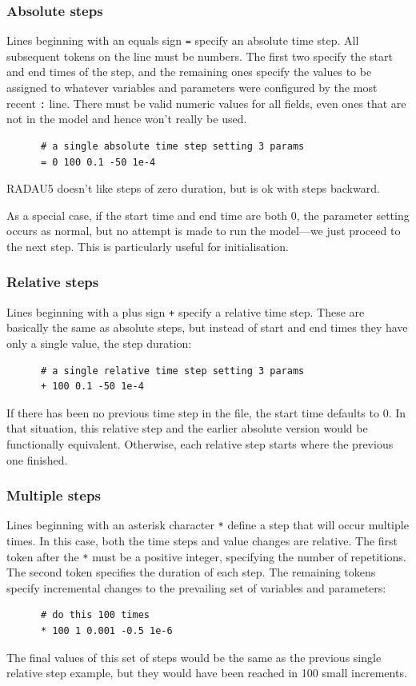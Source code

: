 \documentclass[a4paper,11pt]{article}
\begin{document}
\subsubsection{Absolute steps}
Lines beginning with an equals sign \texttt{=} specify an absolute time step. All subsequent tokens on the line must be numbers. The first two specify the start and end times of the step, and the remaining ones specify the values to be assigned to whatever variables and parameters were configured by the most recent \texttt{:} line. There must be valid numeric values for all fields, even ones that are not in the model and hence won't really be used.
\begin{verbatim}
      # a single absolute time step setting 3 params
      = 0 100 0.1 -50 1e-4
\end{verbatim}
RADAU5 doesn't like steps of zero duration, but is ok with steps backward.

As a special case, if the start time and end time are both 0, the parameter setting occurs as normal, but no attempt is made to run the model---we just proceed to the next step. This is particularly useful for initialisation.

\subsubsection{Relative steps}
Lines beginning with a plus sign \texttt{+} specify a relative time step. These are basically the same as absolute steps, but instead of start and end times they have only a single value, the step duration:
\begin{verbatim}
      # a single relative time step setting 3 params
      + 100 0.1 -50 1e-4
\end{verbatim}
If there has been no previous time step in the file, the start time defaults to 0. In that situation, this relative step and the earlier absolute version would be functionally equivalent. Otherwise, each relative step starts where the previous one finished.

\subsubsection{Multiple steps}
Lines beginning with an asterisk character \texttt{*} define a step that will occur multiple times. In this case, both the time steps and value changes are relative. The first token after the \texttt{*} must be a positive integer, specifying the number of repetitions. The second token specifies the duration of each step. The remaining tokens specify incremental changes to the prevailing set of variables and parameters:
\begin{verbatim}
      # do this 100 times
      * 100 1 0.001 -0.5 1e-6
\end{verbatim}
The final values of this set of steps would be the same as the previous single relative step example, but they would have been reached in 100 small increments.
\end{document}
